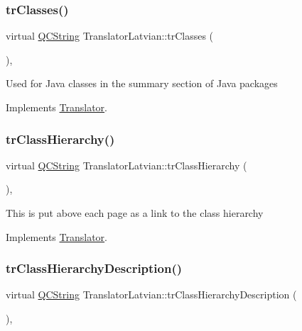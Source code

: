 \subsubsection{\texorpdfstring{trClasses()}{trClasses()}}
{\footnotesize\ttfamily virtual \mbox{\hyperlink{class_q_c_string}{Q\+C\+String}} Translator\+Latvian\+::tr\+Classes (\begin{DoxyParamCaption}{ }\end{DoxyParamCaption})\hspace{0.3cm}{\ttfamily [inline]}, {\ttfamily [virtual]}}

Used for Java classes in the summary section of Java packages 

Implements \mbox{\hyperlink{class_translator}{Translator}}.

\mbox{\label{class_translator_latvian_a3bede943433c8f8780694a95e01d9bc6}} 
\subsubsection{\texorpdfstring{trClassHierarchy()}{trClassHierarchy()}}
{\footnotesize\ttfamily virtual \mbox{\hyperlink{class_q_c_string}{Q\+C\+String}} Translator\+Latvian\+::tr\+Class\+Hierarchy (\begin{DoxyParamCaption}{ }\end{DoxyParamCaption})\hspace{0.3cm}{\ttfamily [inline]}, {\ttfamily [virtual]}}

This is put above each page as a link to the class hierarchy 

Implements \mbox{\hyperlink{class_translator}{Translator}}.

\mbox{\label{class_translator_latvian_aa582689c5bbb57f3e77f45cc57fd684d}} 
\subsubsection{\texorpdfstring{trClassHierarchyDescription()}{trClassHierarchyDescription()}}
{\footnotesize\ttfamily virtual \mbox{\hyperlink{class_q_c_string}{Q\+C\+String}} Translator\+Latvian\+::tr\+Class\+Hierarchy\+Description (\begin{DoxyParamCaption}{ }\end{DoxyParamCaption})\hspace{0.3cm}{\ttfamily [inline]}, {\ttfamily [virtual]}}

